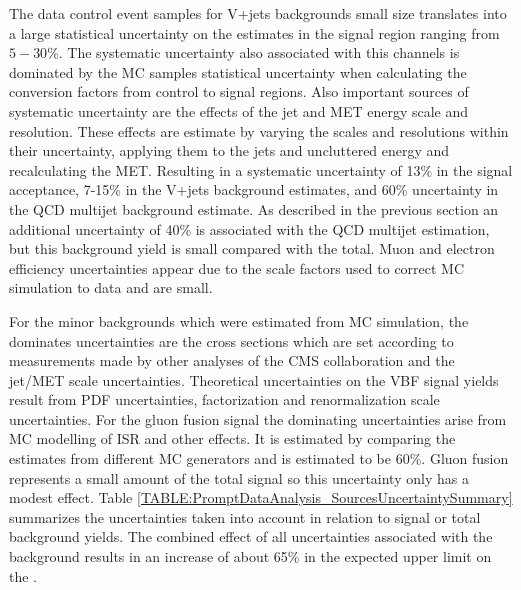 The data control event samples for V+jets backgrounds small size translates into a large statistical uncertainty on the estimates in the signal region ranging from $5-30\%$. The systematic uncertainty also associated with this channels is dominated by the \gls{MC} samples statistical uncertainty when calculating the conversion factors from control to signal regions. Also important sources of systematic uncertainty are the effects of the jet and \gls{MET} energy scale and resolution. These effects are estimate by varying the scales and resolutions within their uncertainty, applying them to the jets and uncluttered energy and recalculating the \gls{MET}. Resulting in a systematic uncertainty of 13\% in the signal acceptance, 7-15\% in the V+jets background estimates, and 60\% uncertainty in the \gls{QCD} multijet background estimate. As described in the previous section an additional uncertainty of 40\% is associated with the \gls{QCD} multijet estimation, but this background yield is small compared with the total. Muon and electron efficiency uncertainties appear due to the scale factors used to correct \gls{MC} simulation to data and are small. 

For the minor backgrounds which were estimated from \gls{MC} simulation, the dominates uncertainties are the cross sections which are set according to measurements made by other analyses of the \gls{CMS} collaboration and the jet/\gls{MET} scale uncertainties. Theoretical uncertainties on the \gls{VBF} signal yields result from \gls{PDF} uncertainties, factorization and renormalization scale uncertainties. For the gluon fusion signal the dominating uncertainties arise from \gls{MC} modelling of \gls{ISR} and other effects. It is estimated by comparing the estimates from different \gls{MC} generators and is estimated to be 60\%. Gluon fusion represents a small amount of the total signal so this uncertainty only has a modest effect. Table \ref{TABLE:PromptDataAnalysis_SourcesUncertaintySummary} summarizes the uncertainties taken into account in relation to signal or total background yields. The combined effect of all uncertainties associated with the background results in an increase of about 65\% in the expected upper limit on the \BRinv.

